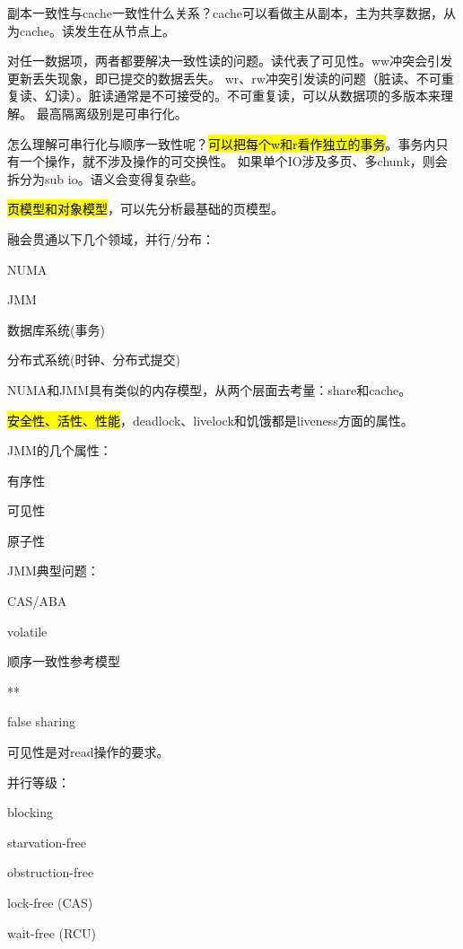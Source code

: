 副本一致性与cache一致性什么关系？cache可以看做主从副本，主为共享数据，从为cache。读发生在从节点上。

对任一数据项，两者都要解决一致性读的问题。读代表了可见性。ww冲突会引发更新丢失现象，即已提交的数据丢失。
wr、rw冲突引发读的问题（脏读、不可重复读、幻读）。脏读通常是不可接受的。不可重复读，可以从数据项的多版本来理解。
最高隔离级别是可串行化。

怎么理解可串行化与顺序一致性呢？\hl{可以把每个w和r看作独立的事务}。事务内只有一个操作，就不涉及操作的可交换性。
如果单个IO涉及多页、多chunk，则会拆分为sub io。语义会变得复杂些。

\hl{页模型和对象模型}，可以先分析最基础的页模型。

融会贯通以下几个领域，并行/分布：
\begin{enumbox}
\item NUMA
\item JMM
\item 数据库系统(事务)
\item 分布式系统(时钟、分布式提交)
\end{enumbox}

NUMA和JMM具有类似的内存模型，从两个层面去考量：share和cache。

\hl{安全性、活性、性能}，deadlock、livelock和饥饿都是liveness方面的属性。

JMM的几个属性：
\begin{enumbox}
\item 有序性
\item 可见性
\item 原子性
\end{enumbox}

JMM典型问题：
\begin{enumbox}
\item CAS/ABA
\item volatile
\item 顺序一致性参考模型
\item ***
\item false sharing
\end{enumbox}

可见性是对read操作的要求。

并行等级：
\begin{enumbox}
\item blocking
\item starvation-free
\item obstruction-free
\item lock-free (CAS)
\item wait-free (RCU)
\end{enumbox}

